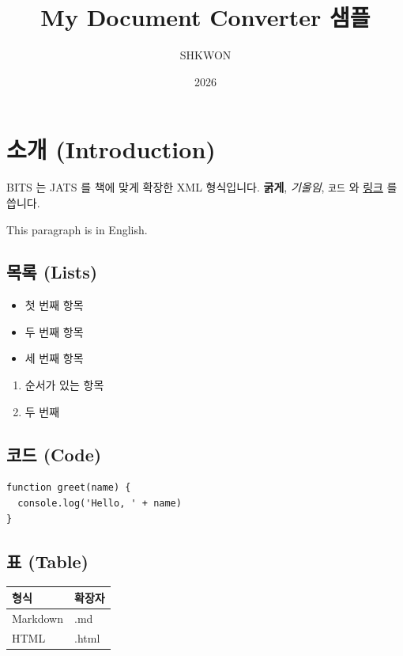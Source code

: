\documentclass[11pt]{article}
\title{My Document Converter 샘플}
\author{SHKWON}
\date{2026}
\begin{document}
\maketitle

\section*{소개 (Introduction)}\label{소개-introduction}

BITS 는 JATS 를 책에 맞게 확장한 XML 형식입니다. \textbf{굵게}, \emph{기울임}, \verb|코드| 와
\href{https://example.com}{링크} 를 씁니다.

This paragraph is in English.

\subsection*{목록 (Lists)}\label{목록-lists}

\begin{itemize}
\item 첫 번째 항목
\item 두 번째 항목
\item 세 번째 항목
\end{itemize}

\begin{enumerate}
\item 순서가 있는 항목
\item 두 번째
\end{enumerate}

\subsection*{코드 (Code)}\label{코드-code}

\begin{verbatim}
function greet(name) {
  console.log('Hello, ' + name)
}
\end{verbatim}

\subsection*{표 (Table)}\label{표-table}

\begin{table}[htbp]
\centering
\begin{tabular}{ll}
\toprule
형식 & 확장자 \\
\midrule
Markdown & .md \\
HTML & .html \\
\bottomrule
\end{tabular}
\end{table}
\end{document}
